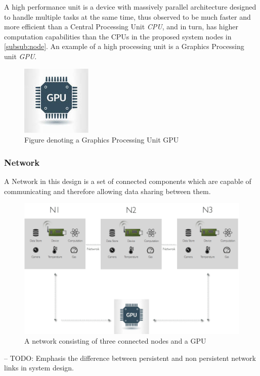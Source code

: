 A high performance unit is a device with massively parallel architecture designed to handle multiple tasks at the same time, thus observed to be much faster and more efficient than a Central Processing Unit \textit{CPU}, and in turn, has higher computation capabilities than the CPUs in the proposed system nodes in \ref{subsub:node}. An example of a high processing unit is  a Graphics Processing unit \textit{GPU}.

\begin{figure}[H]
	\centering
	\includegraphics[scale=0.7]{images/gpu.png}
		\caption{Figure denoting a Graphics Processing Unit GPU}
	\label{fig:gpu}
\end{figure}

\subsubsection{Network}
\label{subsub:network}
A Network in this design is a set of connected components which are capable of communicating and therefore allowing data sharing between them.
\begin{figure}[H]
	\centering
	\includegraphics[scale=0.4]{images/network.png}
	\caption{A network consisting of three connected nodes and a GPU}
	\label{fig:network}
\end{figure}
-- TODO: 
Emphasis the difference between persistent and non persistent network links in system design.

